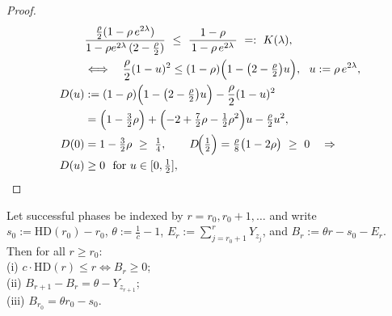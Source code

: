 \documentclass[lettersize,journal]{IEEEtran}
\newcommand{\HD}{\text{HD}}
\begin{document}
\begin{proof}
\begin{align*}
		&\frac{\tfrac{\rho}{2}(1-\rho\,e^{2\lambda})}{1-\rho e^{2\lambda}\,(2-\tfrac{\rho}{2})}
		\  \le\ \frac{1-\rho}{\,1-\rho\,e^{2\lambda}\,}
		\ =:\ K(\lambda),
		\\&\Longleftrightarrow\quad
		\frac{\rho}{2}(1-u)^2 \le (1-\rho)\Bigl(1-\bigl(2-\tfrac{\rho}{2}\bigr)u\Bigr),\ \ u:=\rho\,e^{2\lambda},
		\\
		D(u)
		&:=(1-\rho)\Bigl(1-\bigl(2-\tfrac{\rho}{2}\bigr)u\Bigr)-\frac{\rho}{2}(1-u)^2
		\\&= \Bigl(1-\tfrac{3}{2}\rho\Bigr)+\Bigl(-2+\tfrac{7}{2}\rho-\tfrac{1}{2}\rho^2\Bigr)u-\tfrac{\rho}{2}u^2,
		\\
		D(0)&=1-\tfrac{3}{2}\rho\ \ge\ \tfrac14,\qquad
		D\!\Big(\tfrac12\Big)=\tfrac{\rho}{8}\bigl(1-2\rho\bigr)\ \ge\ 0
		\quad\Rightarrow\quad \\
		D(u)&\ge 0\ \text{ for }u\in[0,\tfrac12],
	\end{align*}
	
	
\end{proof}
\begin{lemma}\label{lem:buffer}
	Let successful phases be indexed by $r=r_0,r_0+1,\dots$ and write
	$s_0:=\HD(r_0)-r_0$, $\theta:=\tfrac{1}{c}-1$, 
	$E_r:=\sum_{j=r_0+1}^{r} Y_{z_j}$, and 
	$B_r:=\theta r - s_0 - E_r$.
	Then for all $r\ge r_0:$  \\
	(i) $c\cdot\HD(r)\le r \iff B_r\ge 0$; \\
	(ii) $B_{r+1}-B_r=\theta-Y_{z_{r+1}}$; \\
	(iii) $B_{r_0}=\theta r_0 - s_0$. 
\end{lemma}
\end{document}
